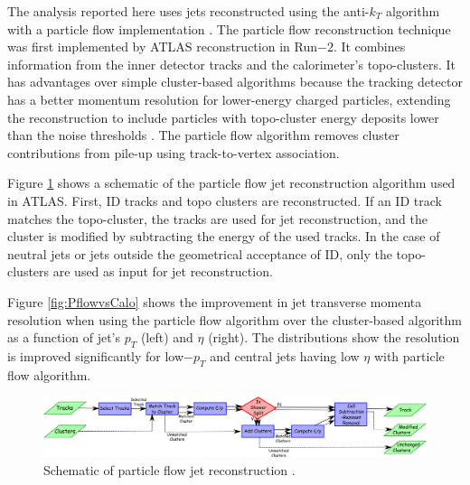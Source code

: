 The analysis reported here uses jets reconstructed using the anti-$k_{T}$ algorithm with a particle flow implementation \cite{ParticleFlow}\cite{AntiKtAlgo}. The particle flow reconstruction technique was first implemented by ATLAS reconstruction in Run$-2$. It combines information from the inner detector tracks and the calorimeter's topo-clusters. It has advantages over simple cluster-based algorithms because the tracking detector has a better momentum resolution for lower-energy charged particles, extending the reconstruction to include particles with topo-cluster energy deposits lower than the noise thresholds \cite{ParticleFlow}. The particle flow algorithm removes cluster contributions from pile-up using track-to-vertex association.

Figure \ref{fig:PflowJets} shows a schematic of the particle flow jet reconstruction algorithm used in ATLAS. First, ID tracks and topo clusters are reconstructed. If an ID track matches the topo-cluster, the tracks are used for jet reconstruction, and the cluster is modified by subtracting the energy of the used tracks. In the case of neutral jets or jets outside the geometrical acceptance of ID, only the topo-clusters are used as input for jet reconstruction. 

Figure \ref{fig:PflowvsCalo} shows the improvement in jet transverse momenta resolution when using the particle flow algorithm over the cluster-based algorithm as a function of jet's $p_{T}$ (left) and $\eta$ (right). The distributions show the resolution is improved significantly for low$-p_{T}$ and central jets having low $\eta$ with particle flow algorithm.

\begin{figure}[!htbp]
    \centering
    \includegraphics[width=0.99\linewidth]{figures/LHC/fig_02.png}
    \caption{ Schematic of particle flow jet reconstruction \cite{ParticleFlow}.\label{fig:PflowJets}}
\end{figure}

